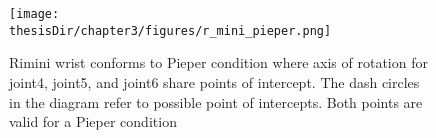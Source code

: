 \begin{figure}
  \centering
  \captionsetup{justification=centering}
  \texttt{[image: \\thesisDir/chapter3/figures/r\_mini\_pieper.png]}
  \caption{Rimini wrist conforms to Pieper condition where axis of rotation 
  for joint4, joint5, and joint6 share points of intercept. The dash circles in the 
  diagram refer to possible point of intercepts. Both points are valid for a Pieper condition}
  \label{fig:r_mini_pieper}
\end{figure}

